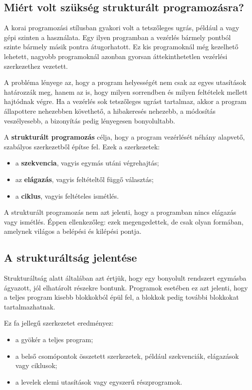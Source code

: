 \subsection{Miért volt szükség strukturált programozásra?}

A korai programozási stílusban gyakori volt a tetszőleges ugrás, például a  vagy gépi szinten a  használata. Egy ilyen programban a vezérlés bármely pontból szinte bármely másik pontra átugorhatott. Ez kis programoknál még kezelhető lehetett, nagyobb programoknál azonban gyorsan áttekinthetetlen vezérlési szerkezethez vezetett.

A probléma lényege az, hogy a program helyességét nem csak az egyes utasítások határozzák meg, hanem az is, hogy milyen sorrendben és milyen feltételek mellett hajtódnak végre. Ha a vezérlés sok tetszőleges ugrást tartalmaz, akkor a program állapottere nehezebben követhető, a hibakeresés nehezebb, a módosítás veszélyesebb, a bizonyítás pedig lényegesen bonyolultabb.

A \textbf{strukturált programozás} célja, hogy a program vezérlését néhány alapvető, szabályos szerkezetből építse fel. Ezek a szerkezetek:

\begin{itemize}
  \item a \textbf{szekvencia}, vagyis egymás utáni végrehajtás;
  \item az \textbf{elágazás}, vagyis feltételtől függő választás;
  \item a \textbf{ciklus}, vagyis feltételes ismétlés.
\end{itemize}

A strukturált programozás nem azt jelenti, hogy a programban nincs elágazás vagy ismétlés. Éppen ellenkezőleg: ezek megengedettek, de csak olyan formában, amelynek világos a belépési és kilépési pontja.

\subsection{A strukturáltság jelentése}

Strukturáltság alatt általában azt értjük, hogy egy bonyolult rendszert egymásba ágyazott, jól elhatárolt részekre bontunk. Programok esetében ez azt jelenti, hogy a teljes program kisebb blokkokból épül fel, a blokkok pedig további blokkokat tartalmazhatnak.

Ez fa jellegű szerkezetet eredményez:

\begin{itemize}
  \item a gyökér a teljes program;
  \item a belső csomópontok összetett szerkezetek, például szekvenciák, elágazások vagy ciklusok;
  \item a levelek elemi utasítások vagy egyszerű részprogramok.
\end{itemize}

